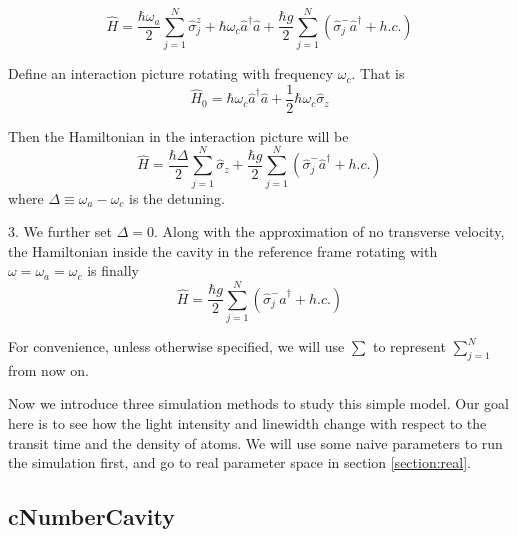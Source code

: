 \documentclass{article}
\newcommand{\omegaa}{\omega_a}
\newcommand{\omegac}{\omega_c}
\begin{document}
\begin{equation}
\label{hamiltimeind}
\hat{H}=\frac{\hbar \omegaa}{2}\sum^{N}_{j=1}\hat{\sigma}^z_j+\hbar \omegac \hat{a}^{\dagger}\hat{a}+\frac{\hbar g}{2}\sum^{N}_{j=1}\left( \hat{\sigma}^-_j\hat{a}^\dagger+h.c.\right)
\end{equation}

Define an interaction picture rotating with frequency $\omegac$. That is
\begin{equation}
\hat{H}_0=\hbar \omegac \hat{a}^\dagger\hat{a}+\frac{1}{2}\hbar \omegac \hat{\sigma}_z
\end{equation}

Then the Hamiltonian in the interaction picture will be
\begin{equation}
\label{hamilinter}
\hat{H}=\frac{\hbar\Delta}{2}\sum_{j=1}^{N}\hat{\sigma}_z+\frac{\hbar g}{2}\sum_{j=1}^{N}\left( \hat{\sigma}^-_j\hat{a}^\dagger+h.c.\right)
\end{equation}
where $\Delta\equiv\omegaa-\omegac$ is the detuning.

3. We further set $\Delta=0$. Along with the approximation of no transverse velocity, the Hamiltonian inside the cavity in the reference frame rotating with $\omega=\omegaa=\omegac$ is finally
\begin{equation}
\label{hamilfinal}
\hat{H}=\frac{\hbar g}{2}\sum_{j=1}^{N}\left( \hat{\sigma}^-_j\hat{a}^\dagger+h.c.\right)
\end{equation}

For convenience, unless otherwise specified, we will use $\sum$ to represent $\sum_{j=1}^N$ from now on.

Now we introduce three simulation methods to study this simple model. Our goal here is to see how the light intensity and linewidth change with respect to the transit time and the density of atoms. We will use some naive parameters to run the simulation first, and go to real parameter space in section \ref{section:real}.


\subsection{cNumberCavity}
\end{document}
